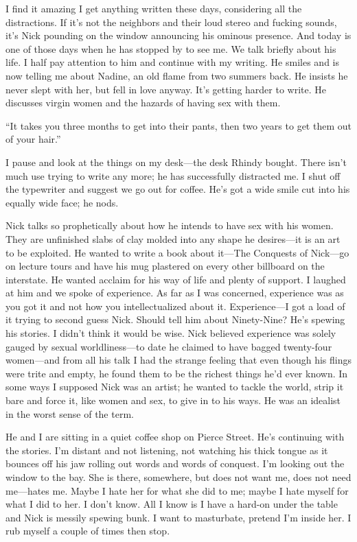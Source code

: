 I find it amazing I get anything written these days, considering all the
distractions. If it's not the neighbors and their loud stereo and
fucking sounds, it's Nick pounding on the window announcing his ominous
presence. And today is one of those days when he has stopped by to see
me. We talk briefly about his life. I half pay attention to him and
continue with my writing. He smiles and is now telling me about Nadine,
an old flame from two summers back. He insists he never slept with her,
but fell in love anyway. It's getting harder to write. He discusses
virgin women and the hazards of having sex with them.

``It takes you three months to get into their pants, then two years to
get them out of your hair.''

I pause and look at the things on my desk---the desk Rhindy bought.
There isn't much use trying to write any more; he has successfully
distracted me. I shut off the typewriter and suggest we go out for
coffee. He's got a wide smile cut into his equally wide face; he nods.

Nick talks so prophetically about how he intends to have sex with his
women. They are unfinished slabs of clay molded into any shape he
desires---it is an art to be exploited. He wanted to write a book about
it---The Conquests of Nick---go on lecture tours and have his mug
plastered on every other billboard on the interstate. He wanted acclaim
for his way of life and plenty of support. I laughed at him and we spoke
of experience. As far as I was concerned, experience was as you got it
and not how you intellectualized about it. Experience---I got a load of
it trying to second guess Nick. Should tell him about Ninety-Nine? He's
spewing his stories. I didn't think it would be wise. Nick believed
experience was solely gauged by sexual worldliness---to date he claimed
to have bagged twenty-four women---and from all his talk I had the
strange feeling that even though his flings were trite and empty, he
found them to be the richest things he'd ever known. In some ways I
supposed Nick was an artist; he wanted to tackle the world, strip it
bare and force it, like women and sex, to give in to his ways. He was an
idealist in the worst sense of the term.

He and I are sitting in a quiet coffee shop on Pierce Street. He's
continuing with the stories. I'm distant and not listening, not watching
his thick tongue as it bounces off his jaw rolling out words and words
of conquest. I'm looking out the window to the bay. She is there,
somewhere, but does not want me, does not need me---hates me. Maybe I
hate her for what she did to me; maybe I hate myself for what I did to
her. I don't know. All I know is I have a hard-on under the table and
Nick is messily spewing bunk. I want to masturbate, pretend I'm inside
her. I rub myself a couple of times then stop.

